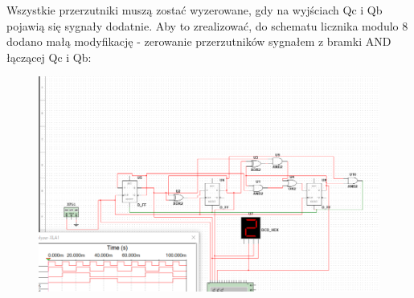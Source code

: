 \documentclass[12pt,a4paper]{article}
\begin{document}
Wszystkie przerzutniki muszą zostać wyzerowane, gdy na wyjściach Qc i Qb pojawią się sygnały dodatnie. Aby to zrealizować, do schematu licznika modulo 8 dodano małą modyfikację - zerowanie przerzutników sygnałem z bramki AND łączącej Qc i Qb:

\begin{figure}[H]
\centering
\includegraphics[width=\textwidth]{img/4d}
\end{figure}
\end{document}
